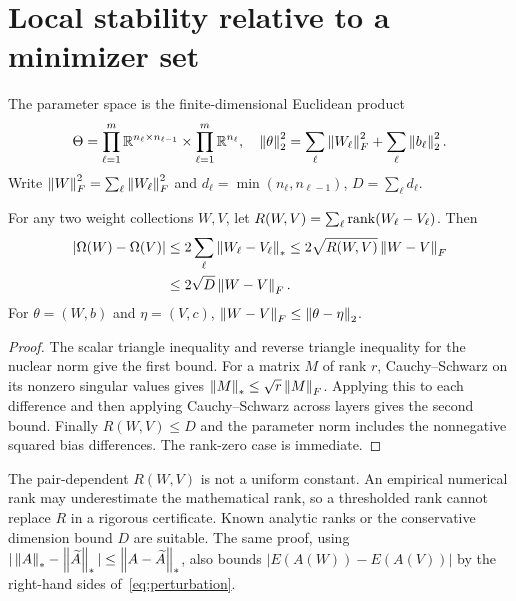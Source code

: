 \section{Local stability relative to a minimizer set}\label{sec:stability}
The parameter space is the finite-dimensional Euclidean product
\[
 \Theta=\prod_{\ell=1}^m\mathbb R^{n_\ell\times n_{\ell-1}}
 \times\prod_{\ell=1}^m\mathbb R^{n_\ell},\quad
 \left\lVert\theta\right\rVert_2^2=\sum_\ell\left\lVert W_\ell\right\rVert_F^2+\sum_\ell\left\lVert b_\ell\right\rVert_2^2.
\]
Write $\left\lVert W\right\rVert_F^2=\sum_\ell\left\lVert W_\ell\right\rVert_F^2$ and
$d_\ell=\min(n_\ell,n_{\ell-1})$, $D=\sum_\ell d_\ell$.

\begin{lemma}\label{lem:perturbation}
For any two weight collections $W,V$, let $R(W,V)=\sum_\ell\operatorname{rank}(W_\ell-V_\ell)$. Then
\begin{align}\label{eq:perturbation}
 |\Omega(W)-\Omega(V)|
 &\le 2\sum_\ell\left\lVert W_\ell-V_\ell\right\rVert_*
 \le2\sqrt{R(W,V)}\left\lVert W-V\right\rVert_F\\
 &\le2\sqrt D\left\lVert W-V\right\rVert_F.\nonumber
\end{align}
For $\theta=(W,b)$ and $\eta=(V,c)$, $\left\lVert W-V\right\rVert_F\le\left\lVert\theta-\eta\right\rVert_2$.
\end{lemma}
\begin{proof}
The scalar triangle inequality and reverse triangle inequality for the nuclear norm give the first bound. For a matrix $M$ of rank $r$, Cauchy--Schwarz on its nonzero singular values gives $\left\lVert M\right\rVert_*\le\sqrt r\left\lVert M\right\rVert_F$. Applying this to each difference and then applying Cauchy--Schwarz across layers gives the second bound. Finally $R(W,V)\le D$ and the parameter norm includes the nonnegative squared bias differences. The rank-zero case is immediate.
\end{proof}
The pair-dependent $R(W,V)$ is not a uniform constant. An empirical numerical rank may underestimate the mathematical rank, so a thresholded rank cannot replace $R$ in a rigorous certificate. Known analytic ranks or the conservative dimension bound $D$ are suitable. The same proof, using $|\left\lVert A\right\rVert_*-\left\lVert\widetilde A\right\rVert_*|\le\left\lVert A-\widetilde A\right\rVert_*$, also bounds $|E(A(W))-E(A(V))|$ by the right-hand sides of~\eqref{eq:perturbation}.

